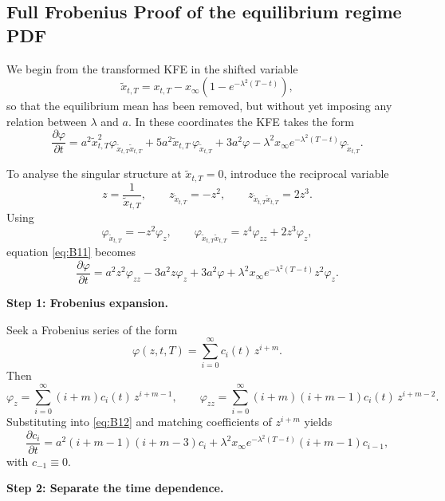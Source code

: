 \documentclass[12pt]{article}
\theoremstyle{statementstyle}
\begin{document}
\begin{appendices}
\subsection{Full Frobenius Proof of the equilibrium regime PDF}
\label{appendix:B1}

We begin from the transformed KFE in the shifted variable
\[
\widetilde{x}_{t,T}
=
x_{t,T}
-
x_{\infty}\!\left(1-e^{-\lambda^{2}(T-t)}\right),
\]
so that the equilibrium mean has been removed, but without yet imposing any
relation between \(\lambda\) and \(a\). In these coordinates the KFE takes the form
\begin{equation}
\frac{\partial \varphi}{\partial t}
=
a^{2}\widetilde{x}_{t,T}^{2}\varphi_{\widetilde{x}_{t,T}\widetilde{x}_{t,T}}
+
5a^{2}\widetilde{x}_{t,T}\,\varphi_{\widetilde{x}_{t,T}}
+
3a^{2}\varphi
-
\lambda^{2}x_{\infty}e^{-\lambda^{2}(T-t)}\varphi_{\widetilde{x}_{t,T}}.
\tag{B.1.1}\label{eq:B11}
\end{equation}

To analyse the singular structure at \(\widetilde{x}_{t,T}=0\), introduce the reciprocal
variable
\[
z=\frac{1}{\widetilde{x}_{t,T}},
\qquad
z_{\widetilde{x}_{t,T}}=-z^{2},
\qquad
z_{\widetilde{x}_{t,T}\widetilde{x}_{t,T}}=2z^{3}.
\]
Using
\[
\varphi_{\widetilde{x}_{t,T}}=-z^{2}\varphi_{z},
\qquad
\varphi_{\widetilde{x}_{t,T}\widetilde{x}_{t,T}}
=
z^{4}\varphi_{zz}+2z^{3}\varphi_{z},
\]
equation \eqref{eq:B11} becomes
\begin{equation}
\frac{\partial \varphi}{\partial t}
=
a^{2}z^{2}\varphi_{zz}
-
3a^{2}z\varphi_{z}
+
3a^{2}\varphi
+
\lambda^{2}x_{\infty}e^{-\lambda^{2}(T-t)}z^{2}\varphi_{z}.
\tag{B.1.2}\label{eq:B12}
\end{equation}

\medskip
\noindent\textbf{Step 1: Frobenius expansion.}

Seek a Frobenius series of the form
\[
\varphi(z,t,T)=\sum_{i=0}^{\infty} c_i(t)\,z^{i+m}.
\]
Then
\[
\varphi_z
=
\sum_{i=0}^{\infty}(i+m)c_i(t)\,z^{i+m-1},
\qquad
\varphi_{zz}
=
\sum_{i=0}^{\infty}(i+m)(i+m-1)c_i(t)\,z^{i+m-2}.
\]
Substituting into \eqref{eq:B12} and matching coefficients of \(z^{i+m}\) yields
\begin{equation}
\frac{\partial c_i}{\partial t}
=
a^{2}(i+m-1)(i+m-3)c_i
+
\lambda^{2}x_{\infty}e^{-\lambda^{2}(T-t)}(i+m-1)c_{i-1},
\tag{B.1.3}\label{eq:B13}
\end{equation}
with \(c_{-1}\equiv 0\).

\medskip
\noindent\textbf{Step 2: Separate the time dependence.}


\end{appendices}
\end{document}
